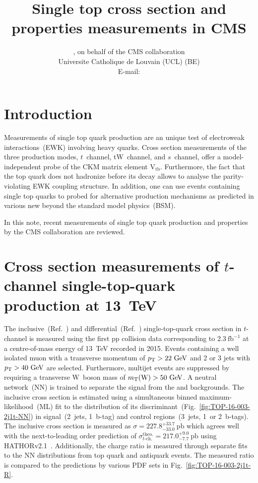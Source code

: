 \documentclass{PoS}
\title{Single top cross section and properties measurements in CMS}
\author{
    \speaker{Matthias Komm}, on behalf of the CMS collaboration\\
    Universite Catholique de Louvain (UCL) (BE)\\
    E-mail: \email{Matthias.Komm@cern.ch}
}
\begin{document}
\section{Introduction}
Measurements of single top quark production are an unique test of electroweak interactions~(EWK) involving heavy quarks. Cross section measurements of the three production modes, $t$~channel, tW~channel, and $s$~channel, offer a model-independent probe of the CKM matrix element $\mathrm{V}_\mathrm{tb}$. Furthermore, the fact that the top quark does not hadronize before its decay allows to analyse the parity-violating EWK coupling structure. In addition, one can use events containing single top quarks to probed for alternative production mechanisms as predicted in various new beyond the standard model physics~(BSM).

In this note, recent measurements of single top quark production and properties by the CMS collaboration are reviewed.


\section{Cross section measurements of $t$-channel single-top-quark production at 13~TeV}

The inclusive~(Ref.~\cite{CMS-PAS-TOP-16-003}) and differential~(Ref.~\cite{CMS-PAS-TOP-16-004}) single-top-quark cross section in $t$-channel is measured using the first pp collision data corresponding to $2.3~\mathrm{fb^{-1}}$ at a centre-of-mass energy of 13~TeV recorded in 2015. Events containing a well isolated muon with a transverse momentum of $p_\mathrm{T}>22~\mathrm{GeV}$ and 2 or 3 jets with $p_\mathrm{T}>40~\mathrm{GeV}$ are selected. Furthermore, multijet events are suppressed by requiring a transverse W~boson mass of $m_{\mathrm{T}}(\mathrm{W})>50~\mathrm{GeV}$. A neutral network~(NN) is trained to separate the signal from the \wjets and \ttbar backgrounds. The inclusive cross section is estimated using a simultaneous binned maximum-likelihood~(ML) fit to the distribution of its discriminant~(Fig.~\ref{fig:TOP-16-003-2j1t-NN}) in signal~(2~jets, 1~b-tag) and control regions~(3~jets, 1~or 2~b-tags). The inclusive cross section is measured as $\sigma=227.8^{+33.7}_{-33.0}~\mathrm{pb}$ which agrees well with the next-to-leading order prediction of $\sigma_{t\mbox{-}\mathrm{ch.}}^\mathrm{theo.}=217.0^{+9.0}_{-7.7}~\mathrm{pb}$ using \textsc{HATHOR}v2.1~\cite{hathor}. Additionally, the charge ratio is measured through separate fits to the NN distributions from top quark and antiquark events. The measured ratio is compared to the predictions by various PDF sets in Fig.~\ref{fig:TOP-16-003-2j1t-R}.
\end{document}
